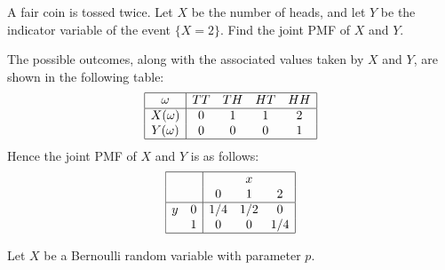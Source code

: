 \begin{exercise}
\begin{questions}
\question
A fair coin is tossed twice. Let $X$ be the number of heads, and let $Y$ be the indicator variable of the event $\{X=2\}$. Find the joint PMF of $X$ and $Y$.
\begin{answer}
The possible outcomes, along with the associated values taken by $X$ and $Y$, are shown in the following table:
\[
\begin{array}{|c|cccc|}\hline
\omega		& TT		& TH		& HT 	& HH		\\ \hline
X(\omega)	& 0		& 1 		& 1		& 2 		\\ 
Y(\omega)	& 0		& 0		& 0		& 1		\\ \hline
\end{array}
\]
Hence the joint PMF of $X$ and $Y$ is as follows:
\[
\begin{array}{|cc|ccc|} \hline
	&		& 		& x 	& 		\\
	& 		& 0 		& 1		& 2 		\\ \hline
y	& 0		& 1/4	& 1/2	& 0		\\ 
	& 1		& 0 		& 0		& 1/4	\\ \hline
\end{array}
\]
\end{answer}


\question %
Let $X$ be a Bernoulli random variable with parameter $p$. %


\end{questions}
\end{exercise}
